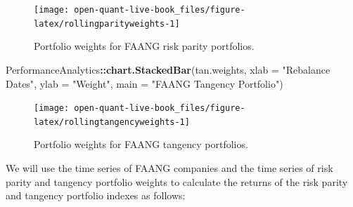 \documentclass[]{book}
\newenvironment{Shaded}{\begin{snugshade}}{\end{snugshade}}
\newcommand{\KeywordTok}[1]{\textcolor[rgb]{0.13,0.29,0.53}{\textbf{#1}}}
\newcommand{\DataTypeTok}[1]{\textcolor[rgb]{0.13,0.29,0.53}{#1}}
\newcommand{\StringTok}[1]{\textcolor[rgb]{0.31,0.60,0.02}{#1}}
\newcommand{\OtherTok}[1]{\textcolor[rgb]{0.56,0.35,0.01}{#1}}
\newcommand{\OperatorTok}[1]{\textcolor[rgb]{0.81,0.36,0.00}{\textbf{#1}}}
\newcommand{\NormalTok}[1]{#1}
\theoremstyle{definition}
\theoremstyle{definition}
\theoremstyle{definition}
\theoremstyle{remark}
\begin{document}
\begin{figure}[H]

{\centering \texttt{[image: open-quant-live-book\_files/figure-latex/rollingparityweights-1]} 

}

\caption{Portfolio weights for FAANG risk parity portfolios.}\label{fig:rollingparityweights}
\end{figure}

\begin{Shaded}
\begin{Highlighting}[]
\NormalTok{PerformanceAnalytics}\OperatorTok{::}\KeywordTok{chart.StackedBar}\NormalTok{(tan.weights, }\DataTypeTok{xlab =} \StringTok{"Rebalance Dates"}\NormalTok{, }
  \DataTypeTok{ylab =} \StringTok{"Weight"}\NormalTok{, }\DataTypeTok{main =} \StringTok{"FAANG Tangency Portfolio"}\NormalTok{)}
\end{Highlighting}
\end{Shaded}

\begin{figure}[H]

{\centering \texttt{[image: open-quant-live-book\_files/figure-latex/rollingtangencyweights-1]} 

}

\caption{Portfolio weights for FAANG tangency portfolios.}\label{fig:rollingtangencyweights}
\end{figure}

We will use the time series of FAANG companies and the time series of
risk parity and tangency portfolio weights to calculate the returns of
the risk parity and tangency portfolio indexes as follows:

\begin{Shaded}
\end{Shaded}
\end{document}
